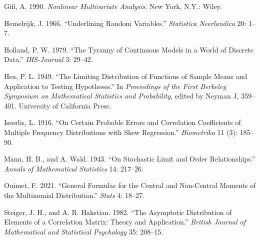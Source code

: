 \documentclass[
  12pt,
  letterpaper,
  DIV=11,
  numbers=noendperiod]{scrartcl}
\newlength{\cslhangindent}
\newenvironment{CSLReferences}[2] %
 {\begin{list}{}{%
  \setlength{\itemindent}{0pt}
  \setlength{\leftmargin}{0pt}
  \setlength{\parsep}{0pt}
  \ifodd #1
   \setlength{\leftmargin}{\cslhangindent}
   \setlength{\itemindent}{-1\cslhangindent}
  \fi
  \setlength{\itemsep}{#2\baselineskip}}}
 {\end{list}}
\begin{document}
\label{refs}
\begin{CSLReferences}{1}{0}
Gifi, A. 1990. \emph{Nonlinear Multivariate Analysis}. New York, N.Y.:
Wiley.

Hemelrijk, J. 1966. {``{Underlining Random Variables}.''}
\emph{Statistica Neerlandica} 20: 1--7.

Holland, P. W. 1979. {``{The Tyranny of Continuous Models in a World of
Discrete Data}.''} \emph{IHS-Journal} 3: 29--42.

Hsu, P. L. 1949. {``The Limiting Distribution of Functions of Sample
Means and Application to Testing Hypotheses.''} In \emph{Proceedings of
the First Berkeley Symposium on Mathematical Statistics and
Probability}, edited by Neyman J, 359--401. University of California
Press.

Isserlis, L. 1916. {``On Certain Probable Errors and Correlation
Coefficients of Multiple Frequency Distributions with Skew
Regression.''} \emph{Biometrika} 11 (3): 185--90.

Mann, H. B., and A. Wald. 1943. {``{On Stochastic Limit and Order
Relationships}.''} \emph{Annals of Mathematical Statistics} 14: 217--26.

Ouimet, F. 2021. {``General Formulas for the Central and Non-Central
Moments of the Multinomial Distribution.''} \emph{Stats} 4: 18--27.

Steiger, J. H., and A. R. Hakstian. 1982. {``{The Asymptotic
Distribution of Elements of a Correlation Matrix: Theory and
Application}.''} \emph{British Journal of Mathematical and Statistical
Psychology} 35: 208--15.

\end{CSLReferences}
\end{document}
